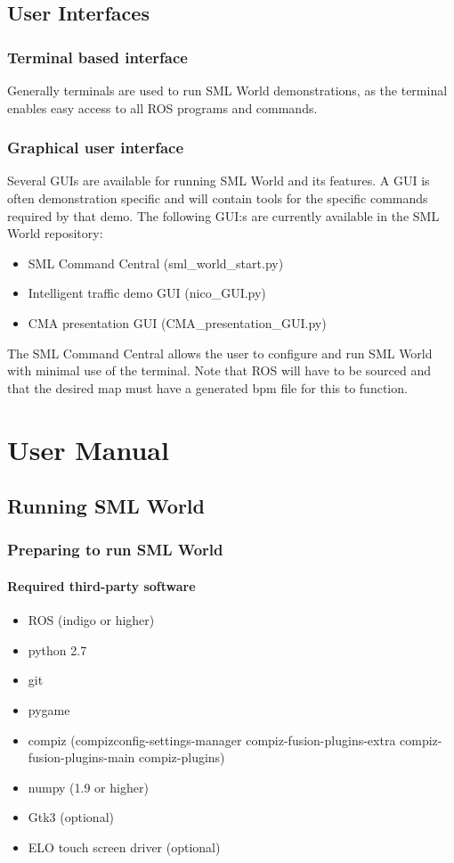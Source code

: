 \documentclass[11pt,a4paper]{book}
\begin{document}
\chapter{User Interfaces}
\section{Terminal based interface}
Generally terminals are used to run SML World demonstrations, as the terminal enables easy access to all ROS programs and commands.

\section{Graphical user interface}
Several GUIs are available for running SML World and its features. A GUI is often demonstration specific and will contain tools for the specific commands required by that demo. The following GUI:s are currently available in the SML World repository:
\begin{itemize}
\item SML Command Central (sml\_world\_start.py)
\item Intelligent traffic demo GUI (nico\_GUI.py)
\item CMA presentation GUI (CMA\_presentation\_GUI.py)
\end{itemize}

\noindent The SML Command Central allows the user to configure and run SML World with minimal use of the terminal. Note that ROS will have to be sourced and that the desired map must have a generated bpm file for this to function. \\


\part{User Manual}


\chapter{Running SML World}
\section{Preparing to run SML World}

\subsection{Required third-party software}
\begin{itemize}
\item ROS (indigo or higher)
\item python 2.7
\item git
\item pygame
\item compiz (compizconfig-settings-manager compiz-fusion-plugins-extra compiz-fusion-plugins-main compiz-plugins)
\item numpy (1.9 or higher)
\item Gtk3 (optional)
\item ELO touch screen driver (optional)
\end{itemize}
\end{document}
